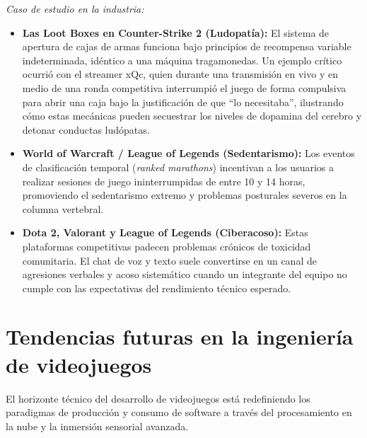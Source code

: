 \documentclass[12pt]{report}
\begin{document}
\textit{Caso de estudio en la industria:}
\begin{itemize}
    \item \textbf{Las Loot Boxes en Counter-Strike 2 (Ludopatía):} El sistema de apertura de cajas de armas funciona bajo principios de recompensa variable indeterminada, idéntico a una máquina tragamonedas. Un ejemplo crítico ocurrió con el streamer xQc, quien durante una transmisión en vivo y en medio de una ronda competitiva interrumpió el juego de forma compulsiva para abrir una caja bajo la justificación de que ``lo necesitaba'', ilustrando cómo estas mecánicas pueden secuestrar los niveles de dopamina del cerebro y detonar conductas ludópatas.
    \item \textbf{World of Warcraft / League of Legends (Sedentarismo):} Los eventos de clasificación temporal (\textit{ranked marathons}) incentivan a los usuarios a realizar sesiones de juego ininterrumpidas de entre 10 y 14 horas, promoviendo el sedentarismo extremo y problemas posturales severos en la columna vertebral.
    \item \textbf{Dota 2, Valorant y League of Legends (Ciberacoso):} Estas plataformas competitivas padecen problemas crónicos de toxicidad comunitaria. El chat de voz y texto suele convertirse en un canal de agresiones verbales y acoso sistemático cuando un integrante del equipo no cumple con las expectativas del rendimiento técnico esperado.
\end{itemize}

\section{Tendencias futuras en la ingeniería de videojuegos}

El horizonte técnico del desarrollo de videojuegos está redefiniendo los paradigmas de producción y consumo de software a través del procesamiento en la nube y la inmersión sensorial avanzada.
\end{document}
